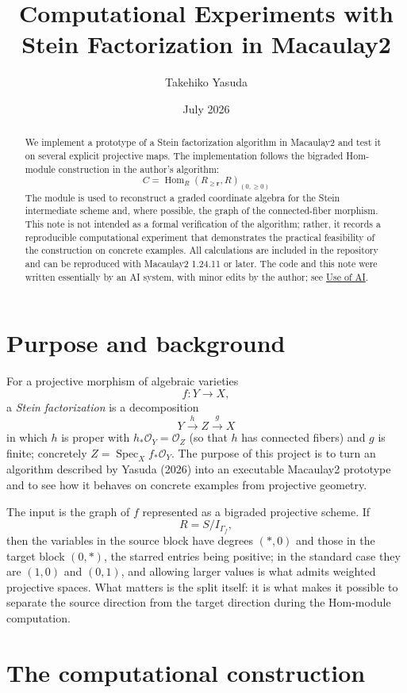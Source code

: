 \documentclass[11pt,reqno]{amsart}
\title{Computational Experiments with Stein Factorization in Macaulay2}
\author{Takehiko Yasuda}
\date{July 2026}
\newcommand{\sO}{\ensuremath{\mathcal{O}}}
\DeclareMathOperator{\Hom}{Hom}
\DeclareMathOperator{\Spec}{Spec}
\theoremstyle{plain}
\theoremstyle{definition}
\begin{document}
\begin{abstract}
We implement a prototype of a Stein factorization algorithm in Macaulay2
and test it on several explicit projective maps. The implementation
follows the bigraded Hom-module construction in the author's algorithm:
\[C=\Hom_R(R_{\geq\mathbf{r}},R)_{(0,\geq 0)}\]
The module is used to reconstruct a graded coordinate algebra for the
Stein intermediate scheme and, where possible, the graph of the
connected-fiber morphism. This note is not intended as a formal
verification of the algorithm; rather, it records a reproducible
computational experiment that demonstrates the practical feasibility of
the construction on concrete examples. All calculations are included in
the repository and can be reproduced with Macaulay2 1.24.11 or later.
The code and this note were written essentially by an AI system, with
minor edits by the author; see \hyperref[sec:ai]{Use of AI}.
\end{abstract}

\maketitle


\section{Purpose and background}\label{sec:background}

For a projective morphism of algebraic varieties
\[f:Y\longrightarrow X,\]
a \emph{Stein factorization} is a decomposition
\[Y\xrightarrow{h} Z\xrightarrow{g} X\]
in which \(h\) is proper with \(h_*\sO_Y=\sO_Z\) (so that \(h\) has
connected fibers) and \(g\) is finite; concretely
\(Z=\Spec_X f_*\sO_Y\). The purpose of this project is to turn an
algorithm described by Yasuda (2026) into an executable Macaulay2
prototype and to see how it behaves on concrete examples from projective
geometry.

The input is the graph of \(f\) represented as a bigraded projective
scheme. If
\[R=S/I_{\Gamma_f},\]
then the variables in the source block have degrees \((\ast,0)\) and
those in the target block \((0,\ast)\), the starred entries being
positive; in the standard case they are \((1,0)\) and \((0,1)\), and
allowing larger values is what admits weighted projective spaces. What
matters is the split itself: it is what makes it possible to separate the
source direction from the target direction during the Hom-module
computation.

\section{The computational construction}\label{sec:construction}
\end{document}
